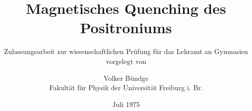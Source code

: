 \documentclass[a4paper,oneside]{scrartcl} %
\title{Magnetisches Quenching des Positroniums}
\subtitle{Zulassungsarbeit zur wissenschaftlichen Prüfung für das Lehramt an Gymnasien vorgelegt von}
\author{Volker Bündge\\
Fakultät für Physik der Universität Freiburg i. Br.}
\date{Juli 1975}
\begin{document}
\begin{titlepage}
  \maketitle
  \vfill
  \thispagestyle{empty}
\end{titlepage}

\tableofcontents
\clearpage







%


\clearpage

% 
%
\end{document}
